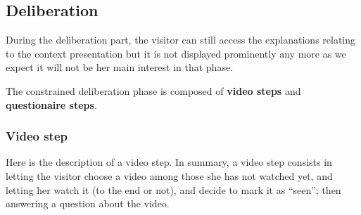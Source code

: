 \documentclass[version=3.21, pagesize, twoside=off, bibliography=totoc, DIV=calc, fontsize=12pt, a4paper]{scrartcl}
\begin{document}
\subsection{Deliberation}
During the deliberation part, the visitor can still access the explanations relating to the context presentation but it is not displayed prominently any more as we expect it will not be her main interest in that phase.

The constrained deliberation phase is composed of \textbf{video steps} and \textbf{questionaire steps}. 

\subsubsection{Video step}
Here is the description of a video step. In summary, a video step consists in letting the visitor choose a video among those she has not watched yet, and letting her watch it (to the end or not), and decide to mark it as “seen”; then answering a question about the video.
\end{document}
